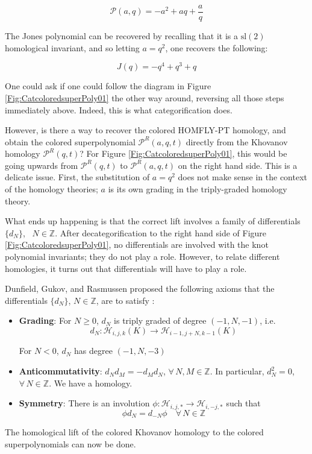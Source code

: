 \documentclass[a4paper,titlepage,twoside]{book}
\begin{document}
\[
\mathcal{P}{( a,q) }= -a^{2} + a q + \frac{a}{q}
\]

The Jones polynomial can be recovered by recalling that it is a  $\text{sl}{(2)}$ homological invariant, and so letting $a=q^2$, one recovers the following:

\[
J(q) = -q^{4} + q^{3} + q
\]


One could ask if one could follow the diagram in Figure \ref{Fig:CatcoloredsuperPoly01} the other way around, reversing all those steps immediately above.  Indeed, this is what categorification does.  

However, is there a way to recover the colored HOMFLY-PT homology, and obtain the colored superpolynomial $\mathcal{P}^R{(a,q,t)}$  directly from the Khovanov homology $\mathcal{P}^R{(q,t)}$?  For Figure \ref{Fig:CatcoloredsuperPoly01}, this would be going upwards from $\mathcal{P}^R{(q,t)}$ to $\mathcal{P}^R{(a,q,t)}$ on the right hand side.  This is a delicate issue.  First, the substitution of $a=q^2$ does not make sense in the context of the homology theories; $a$ is its own grading in the triply-graded homology theory.    

What ends up happening is that the correct lift involves a family of differentials $\lbrace d_N \rbrace$, \, $N \in \mathbb{Z}$.  After decategorification to the right hand side of Figure \ref{Fig:CatcoloredsuperPoly01}, no differentials are involved with the knot polynomial invariants; they do not play a role.  However, to relate different homologies, it turns out that differentials will have to play a role. 

Dunfield, Gukov, and Rasmussen proposed the following axioms that the differentials $\lbrace d_N \rbrace$, $N \in \mathbb{Z}$, are to satisfy \cite{DunfieldGukovRasmussen2005}:

\begin{itemize}
  \item \textbf{Grading}: For $N \geq 0$, $d_N$ is triply graded of degree $( -1,N,-1)$, i.e.
\[
d_N: \mathcal{H}_{ i, j ,k }{ (K) } \to \mathcal{H}_{ i-1, j+N, k-1}{ (K) } 
\]

For $N<0$, $d_N$ has degree $(-1,N, -3)$
\item \textbf{Anticommutativity}: $d_N d_M = -d_M d_N$, $\forall\, N, M \in \mathbb{Z}$.  In particular, $d^2_N =0$, $\forall \, N \in \mathbb{Z}$.  We have a homology.  
\item \textbf{Symmetry}: There is an involution $\phi: \mathcal{H}_{ i,j,* } \to \mathcal{H}_{i,-j,*}$ such that
\[
\phi d_N = d_{-N} \phi \quad \forall \, N \in \mathbb{Z}
\]
\end{itemize}
The homological lift of the colored Khovanov homology to the colored superpolynomials can now be done. 
\end{document}
